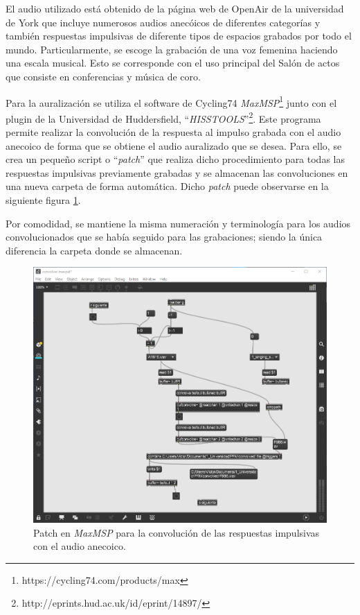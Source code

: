 \documentclass[11pt,a4paper,twoside]{book}
\begin{document}
                El audio utilizado está obtenido de la página web de OpenAir de la universidad de York que incluye numerosos audios anecóicos de diferentes categorías y también respuestas impulsivas de diferente tipos de espacios grabados por todo el mundo. Particularmente, se escoge la grabación de una voz femenina haciendo una escala musical. Esto se corresponde con el uso principal del Salón de actos que consiste en conferencias y música de coro.
        
                Para la auralización se utiliza el software de Cycling74 \textit{MaxMSP}\footnote{https://cycling74.com/products/max} junto con el plugin de la Universidad de Huddersfield, ``\textit{HISSTOOLS}''\footnote{http://eprints.hud.ac.uk/id/eprint/14897/}. Este programa permite realizar la convolución de la respuesta al impulso grabada con el audio anecoico de forma que se obtiene el audio auralizado que se desea. Para ello, se crea un pequeño script o ``\textit{patch}'' que realiza dicho procedimiento para todas las respuestas impulsivas previamente grabadas y se almacenan las convoluciones en una nueva carpeta de forma automática. Dicho \textit{patch} puede observarse en la siguiente figura \ref{fig:convolver_max}.
                
                Por comodidad, se mantiene la misma numeración y terminología para los audios convolucionados que se había seguido para las grabaciones; siendo la única diferencia la carpeta donde se almacenan.
        
                \begin{figure}[H]
	                \includegraphics[scale=0.4]{../imagenes/convolver_max.png}
			        \centering
			        \caption{Patch en \textit{MaxMSP} para la convolución de las respuestas impulsivas con el audio anecoico.}
			        \label{fig:convolver_max}
	            \end{figure}
        
\end{document}
